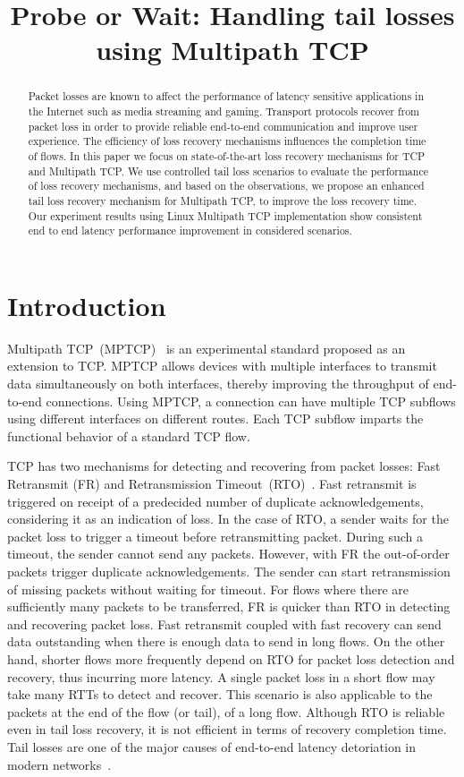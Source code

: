\documentclass[10pt,conference]{IEEEtran}
\title{Probe or Wait: Handling tail losses using Multipath TCP}
\author{\IEEEauthorblockN{Kiran~Yedugundla, Per~Hurtig, Anna~Brunstrom}
\IEEEauthorblockA{Dept. of Computer Science, Karlstad University, Karlstad, Sweden\\
    \{name.surname\}@kau.se
}}
\begin{document}
\maketitle

\begin{abstract}
Packet losses are known to affect the performance of latency sensitive applications in the Internet such as media streaming and gaming. 
Transport protocols recover from packet loss in order to provide reliable end-to-end communication and improve user experience. The efficiency of 
loss recovery mechanisms influences the completion time of flows. In this paper we focus on state-of-the-art loss recovery mechanisms for TCP 
and Multipath TCP. We use controlled tail loss scenarios to evaluate the performance of loss recovery mechanisms, and based on the observations, 
we propose an enhanced tail loss recovery mechanism for Multipath TCP, to improve the loss recovery time. Our experiment results using Linux 
Multipath TCP implementation show consistent end to end latency performance improvement in considered scenarios. 
\end{abstract}

\section{Introduction}


Multipath TCP~(MPTCP)~\cite{rfc6824} is an experimental standard proposed as an extension to TCP. MPTCP allows devices with multiple interfaces to 
transmit data simultaneously on both interfaces, thereby improving the throughput of end-to-end connections. Using MPTCP, a connection can have 
multiple TCP subflows using different interfaces on different routes. Each TCP subflow imparts the functional behavior of a standard TCP flow. 

TCP has two mechanisms for detecting and recovering from packet losses: Fast Retransmit (FR) and Retransmission Timeout~(RTO)~\cite{Flach:2013}. 
Fast retransmit is triggered on receipt of a predecided number of duplicate acknowledgements, considering it as an indication of loss. In the case 
of RTO, a sender waits for the packet loss to trigger a timeout before retransmitting packet. During such a timeout, the sender cannot send any 
packets. However, with FR the out-of-order packets trigger duplicate acknowledgements. The sender can start retransmission of missing packets 
without waiting for timeout. For flows where there are sufficiently many packets to be transferred, FR is quicker than RTO in detecting and 
recovering packet loss. Fast retransmit coupled with fast recovery can send data outstanding when there is enough data to send in long flows. 
On the other hand, shorter flows more frequently depend on RTO for packet loss detection and recovery, thus incurring more latency. A single 
packet loss in a short flow may take many RTTs to detect and recover. This scenario is also applicable to the packets at the end of the flow 
(or tail), of a long flow. Although RTO is reliable even in tail loss recovery, it is not efficient in terms of recovery completion time. Tail 
losses are one of the major causes of end-to-end latency detoriation in modern networks~\cite{Flach:2013}. 
\end{document}
